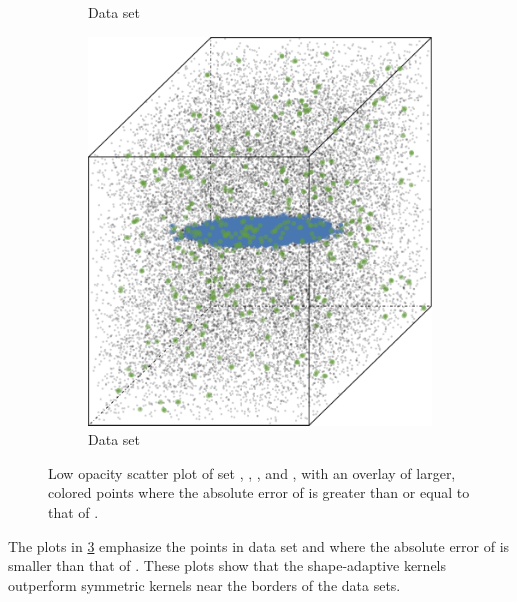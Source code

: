\begin{figure}
\begin{subfigure}{0.23\textwidth}
				\caption{Data set \baakmanFour}
				\label{fig:discussion:performance:mbeLowerError:baakman4}
			\end{subfigure}		
			\begin{subfigure}{0.23\textwidth}
				\centering
				\includegraphics[keepaspectratio=true, width=\textwidth, height=0.23\textheight]{discussion/img/baakman_5_abs_error_mbeSmallerThansambe}
				\caption{Data set \baakmanFive}
				\label{fig:discussion:performance:mbeLowerError:baakman5}
			\end{subfigure}			
			\caption{Low opacity scatter plot of set %
				 \ferdosiOne, %
				 \baakmanOne, %
				 \baakmanFour, and %
				 \baakmanFive, %
				with an overlay of larger, colored points where the absolute error of \sambe is greater than or equal to that of \mbe.}
			\label{fig:discussion:performance:singleSphere:mbeLowerError}
		\end{figure}
		The plots in \cref{fig:discussion:performance:singleSphere:mbeLowerError} emphasize the points in data set \ferdosiOne and \baakmanOne where the absolute error of \mbe is smaller than that of \sambe. These plots show that the shape-adaptive kernels outperform symmetric kernels near the borders of the data sets.
